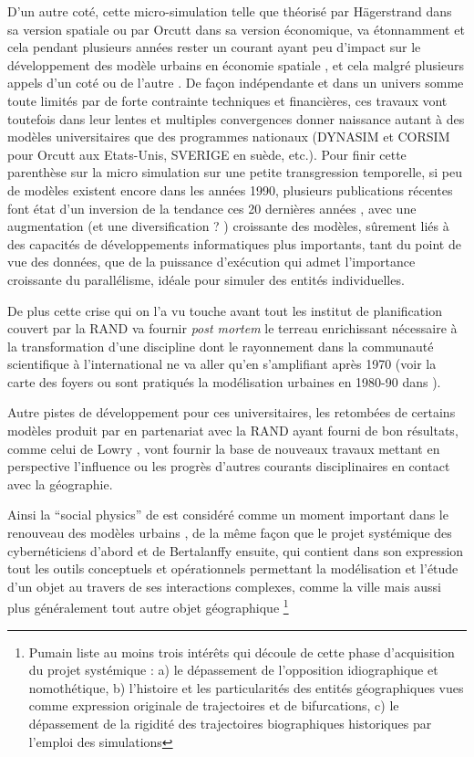 D'un autre coté, cette micro-simulation telle que théorisé par Hägerstrand dans sa version spatiale ou par Orcutt dans sa version économique, va étonnamment et cela pendant plusieurs années rester un courant ayant peu d'impact sur le développement des modèle urbains en économie spatiale \autocite[5]{Sanders2006}, et cela malgré plusieurs appels d'un coté \autocite{Hagerstrand1970} ou de l'autre \autocite[5]{Isard1998}. De façon indépendante et dans un univers somme toute limités par de forte contrainte techniques et financières, ces travaux vont toutefois dans leur lentes et multiples convergences donner naissance autant à des modèles universitaires que des programmes nationaux (DYNASIM et CORSIM pour Orcutt aux Etats-Unis, SVERIGE en suède, etc.). Pour finir cette parenthèse sur la micro simulation sur une petite transgression temporelle, si peu de modèles existent encore dans les années 1990, plusieurs publications récentes font état d'un inversion de la tendance ces 20 dernières années \autocite{Lenormand2013}, avec une augmentation (et une diversification ? ) croissante des modèles, sûrement liés à des capacités de développements informatiques plus importants, tant du point de vue des données, que de la puissance d’exécution qui admet l'importance croissante du parallélisme, idéale pour simuler des entités individuelles. \autocite[5]{Sanders2006} \autocite{Lenormand2013}

De plus cette crise qui on l'a vu touche avant tout les institut de planification couvert par la RAND va fournir \textit{post mortem} le terreau enrichissant nécessaire à la transformation d'une discipline dont le rayonnement dans la communauté scientifique à l'international ne va aller qu'en s'amplifiant après 1970 (voir la carte des foyers ou sont pratiqués la modélisation urbaines en 1980-90 dans \autocite{Wegener1994}).

Autre pistes de développement pour ces universitaires, les retombées de certains modèles produit par en partenariat avec la RAND ayant fourni de bon résultats, comme celui de Lowry \autocite {Lowry1964}, vont fournir la base de nouveaux travaux mettant en perspective l'influence ou les progrès d'autres courants disciplinaires en contact avec la géographie. 

Ainsi la \foreignquote{english}{social physics} de \autocite{Wilson1970} est considéré comme un moment important dans le renouveau des modèles urbains \autocite{Griffith2010}, de la même façon que le projet systémique des cybernéticiens d'abord et de Bertalanffy ensuite, qui contient dans son expression tout les outils conceptuels et opérationnels permettant la modélisation et l'étude d'un objet au travers de ses interactions complexes, comme la ville \autocite{Forrester1969} \autocite[11]{Batty1976, Batty2001} mais aussi plus généralement tout autre objet géographique \autocite[27-28]{Pumain2003} \footnote{ Pumain liste au moins trois intérêts qui découle de cette phase d'acquisition du projet systémique : a) le dépassement de l'opposition idiographique et nomothétique, b) l'histoire et les particularités des entités géographiques vues comme expression originale de trajectoires et de bifurcations, c) le dépassement de la rigidité des trajectoires biographiques historiques par l'emploi des simulations}

